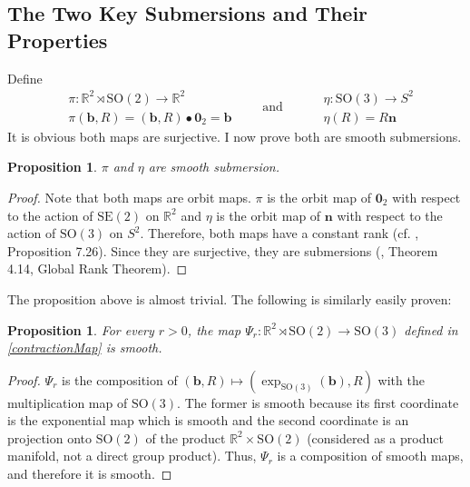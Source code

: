 \documentclass[a4paper,11pt]{scrartcl}
\newcounter{dummy}
\numberwithin{dummy}{section}
\theoremstyle{plain}
\newtheorem{proposition}[dummy]{Proposition}
\theoremstyle{plain}
\theoremstyle{plain}
\theoremstyle{plain}
\theoremstyle{nonumberplain}
\newtheorem{proof}{Proof}
\newcommand{\F}[1][R]{\mathbb{#1}} %
\newcommand{\SE}{\mathrm{SE}}
\newcommand{\SO}{\mathrm{SO}}
\begin{document}
	\subsection{The Two Key Submersions and Their Properties}
	Define
	\begin{equation}
	\label{SubmersionsDef}
	\begin{aligned}
	&\pi : \F^{2} \rtimes \SO(2) \to \F^{2} \\
	&\pi (\mathbf{b}, R) = (\mathbf{b}, R) \bullet \mathbf{0}_{2} =  \mathbf{b}
	\end{aligned}
	\qquad\mbox{and}\qquad
	\begin{aligned}
	&\eta : \SO(3) \to S^{2} \\
	&\eta (R) = R \mathbf{n}
	\end{aligned}
	\end{equation}
	It is obvious both maps are surjective. I now prove both are smooth submersions.
	
	\begin{proposition}
		\label{AreSubmersions}
		$ \pi $ and $ \eta $ are smooth submersion.
	\end{proposition}
	
	\begin{proof}
		Note that both maps are orbit maps. $ \pi $ is the orbit map of $ \mathbf{0}_{2} $ with respect to the action of $ \SE(2) $ on $ \F^{2} $ and $ \eta $ is the orbit map of $ \mathbf{n} $ with respect to the action of $ \SO(3) $ on $ S^{2} $. Therefore, both maps have a constant rank (cf. \cite[166]{Lee2013}, Proposition 7.26). Since they are surjective, they are submersions (\cite[83]{Lee2013}, Theorem 4.14, Global Rank Theorem).
	\end{proof}
	
	The proposition above is almost trivial. The following is similarly easily proven:
	\begin{proposition}
		For every $ r > 0 $, the map $ \Psi_{r} : \F^{2} \rtimes \SO(2) \to \SO(3) $ defined in \eqref{contractionMap} is smooth.
	\end{proposition}
	
	\begin{proof}
		$ \Psi_{r}  $ is the composition of $ (\mathbf{b}, R) \mapsto \left(\exp_{\SO(3)} (\mathbf{b}), R  \right) $ with the multiplication map of $ \SO(3) $. The former is smooth because its first coordinate is the exponential map which is smooth and the second coordinate is an projection onto $ \SO(2) $ of the product $ \F^{2} \times \SO(2) $ (considered as a product manifold, not a direct group product). Thus, $ \Psi_{r} $ is a composition of smooth maps, and therefore it is smooth.
	\end{proof}
	
\end{document}
